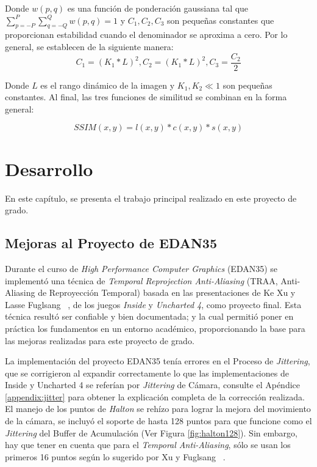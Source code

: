 \documentclass[pregrado]{tesis-usb} %
\begin{document}
Donde $w(p, q)$ es una función de ponderación gaussiana tal que $\sum\limits_{p = -P}^{P}\sum\limits_{q = -Q}^{Q} w(p, q) = 1$ y $C_1, C_2, C_3$ son pequeñas constantes que proporcionan estabilidad cuando el denominador se aproxima a cero. Por lo general, se establecen de la siguiente manera: 
\begin{equation*}
	C_1=(K_1*L)^2,C_2=(K_1*L)^2,C_3=\frac{C_2}{2}
\end{equation*}

Donde $L$ es el rango dinámico de la imagen y $K_1, K_2 \ll1$ son pequeñas constantes. Al final, las tres funciones de similitud se combinan en la forma general:

\begin{equation}\label{eq:ssim}
SSIM(x,y)=l(x,y)*c(x,y)*s(x,y)
\end{equation}



\chapter{Desarrollo}
En este capítulo, se presenta el trabajo principal realizado en este proyecto de grado.

\section{Mejoras al Proyecto de EDAN35}
Durante el curso de \textit{High Performance Computer Graphics} (EDAN35) se implementó una técnica de \textit{Temporal Reprojection Anti-Aliasing} (TRAA, Anti-Aliasing de Reproyección Temporal) basada en las presentaciones de Ke Xu y Lasse Fuglsang ~\cite{XU2016, Fuglsand2016}, de los juegos \textit{Inside} y \textit{Uncharted 4}, como proyecto final. Esta técnica resultó ser confiable y bien documentada; y la cual permitió poner en práctica los fundamentos en un entorno académico, proporcionando la base para las mejoras realizadas para este proyecto de grado. 

La implementación del proyecto EDAN35 tenía errores en el Proceso de \textit{Jittering}, que se corrigieron al expandir correctamente lo que las implementaciones de Inside y Uncharted 4  se referían por \textit{Jittering} de Cámara, consulte el Apéndice \ref{appendix:jitter} para obtener la explicación completa de la corrección realizada. El manejo de los puntos de \textit{Halton} se rehízo para lograr la mejora del movimiento de la cámara, se incluyó el soporte de hasta 128 puntos para que funcione como el \textit{Jittering} del Buffer de Acumulación (Ver Figura \ref{fig:halton128}). Sin embargo, hay que tener en cuenta que para el \textit{Temporal Anti-Aliasing}, sólo se usan los primeros 16 puntos según lo sugerido por Xu y Fuglsang ~\cite{XU2016, Fuglsand2016}. 
\end{document}
